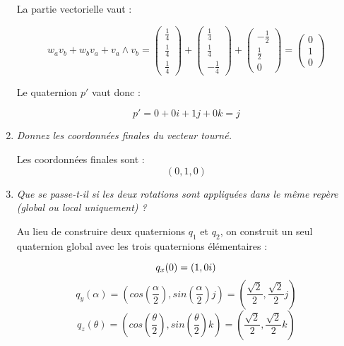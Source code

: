 \documentclass[a4paper,12pt]{article}
\begin{document}
\begin{enumerate}
            La partie vectorielle vaut :

            \[
               w_a v_b + w_b v_a + v_a \wedge v_b = 
              \begin{pmatrix} \frac{1}{4} \\ \frac{1}{4} \\ \frac{1}{4} \end{pmatrix} +
              \begin{pmatrix} \frac{1}{4} \\ \frac{1}{4} \\ -\frac{1}{4} \end{pmatrix} +
              \begin{pmatrix} -\frac{1}{2} \\ \frac{1}{2} \\ 0 \end{pmatrix} =
              \begin{pmatrix} 0 \\ 1 \\ 0 \end{pmatrix}
            \]

            Le quaternion \( p' \) vaut donc :

            \[ p' = 0 + 0i + 1j + 0k = \boxed{j} \] 


          \item \emph{Donnez les coordonnées finales du vecteur tourné.}

            Les coordonnées finales sont : \[ (0, 1, 0) \]

          \item \emph{Que se passe-t-il si les deux rotations sont appliquées dans le même repère (global ou local uniquement) ?}

          Au lieu de construire deux quaternions \( q_1 \) et \( q_2 \), on construit un seul quaternion global avec les trois quaternions élémentaires :

            \[
              q_{x}(0) = (1, 0i) \newline
            \]
            \[ 
              q_{y}(\alpha) 
              = \left(cos \left( \frac{\alpha}{2} \right), sin \left(\frac{\alpha}{2} \right)j\right) 
              = \left( \frac{\sqrt{2}}{2}, \frac{\sqrt{2}}{2}j \right) 
            \]
            \[ 
              q_{z}(\theta) 
              = \left(cos \left( \frac{\theta}{2} \right), sin \left(\frac{\theta}{2} \right)k\right) 
              = \left( \frac{\sqrt{2}}{2}, \frac{\sqrt{2}}{2}k \right) 
            \]


\end{enumerate}
\end{document}
